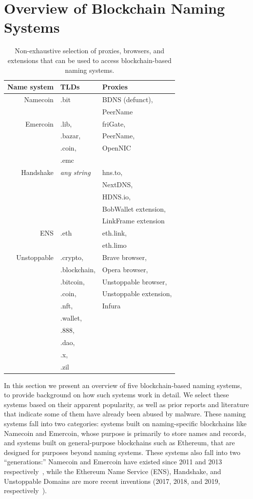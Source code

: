 \section{Overview of Blockchain Naming Systems}
\label{sec:naming_systems}

\begin{table}
	\begin{tabular}{r l l}
		\toprule
		Name system & TLDs & Proxies \\
		\midrule
		Namecoin & .bit & BDNS (defunct), \\
		& & PeerName \\
		Emercoin & .lib, &  friGate, \\
		& .bazar, &  PeerName,\\
		& .coin, & OpenNIC \\
		& .emc & \\
		Handshake & \emph{any string} & hns.to, \\
		& & NextDNS, \\
		& & HDNS.io,\\
		& & BobWallet extension, \\
		& & LinkFrame extension \\
		ENS & .eth & eth.link, \\
		& & eth.limo \\
		Unstoppable & .crypto, & Brave browser, \\
		& .blockchain, & Opera browser, \\
		& .bitcoin, & Unstoppable browser, \\
		& .coin, & Unstoppable extension, \\
		& .nft, & Infura\\
		& .wallet, & \\
		& .888, & \\
		& .dao, & \\
		& .x, & \\
		& .zil & \\
		\bottomrule
	\end{tabular}
	\caption{Non-exhaustive selection of proxies, browsers, 
		and extensions 
		that can be used to access blockchain-based naming 
		systems.}
	\label{tab:proxies_and_tlds}
\end{table}

In this section we present an overview of five blockchain-based naming 
systems, to provide background on how such systems work in detail. We select 
these systems based on their apparent popularity, as well as 
prior reports and literature that indicate some of them have already been 
abused by malware. These naming systems fall into two categories: systems built 
on naming-specific blockchains like Namecoin and Emercoin, whose purpose is 
primarily to store names and records, and systems built on general-purpose 
blockchains such as Ethereum, that are designed for purposes beyond naming 
systems. These systems also fall into two ``generations:'' Namecoin and 
Emercoin have existed since 2011 and 2013 
respectively~\cite{namecoin, emercoin}, while the Ethereum 
Name Service (ENS), Handshake, and Unstoppable 
Domains are more recent inventions (2017, 2018, and 2019, 
respectively~\cite{ens_website, handshake_website, 
first_ud_txn}). 


